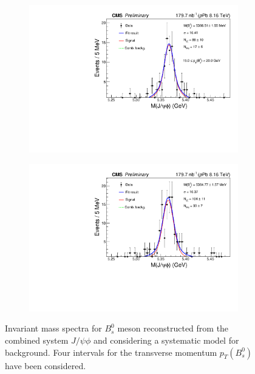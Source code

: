 \begin{figure}[htp!]
\begin{subfigure}[b]{0.475\textwidth}
		\includegraphics[width=\textwidth]{MainContent/Figs/mass/mass_BsFit_ptbins_sysbkg_15_20.PDF}
		\caption{}
	\end{subfigure}
	\hfill
	\begin{subfigure}[b]{0.475\textwidth}
		\centering
		\includegraphics[width=\textwidth]{MainContent/Figs/mass/mass_BsFit_ptbins_sysbkg_20_50.PDF}
		\caption{}%
	\end{subfigure}
	\caption{Invariant mass spectra for $B^0_s$ meson reconstructed from the combined system $J/\psi \phi$ and considering a systematic model for background. Four intervals for the transverse momentum $p_T(B^0_s)$ have been considered.}
	\label{fig:mass_ptbins_sysbkg}
	
\end{figure}

